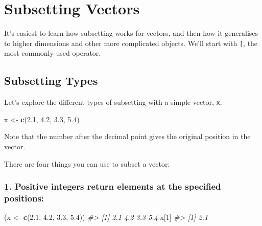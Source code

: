 \documentclass[]{book}
\newenvironment{Shaded}{\begin{snugshade}}{\end{snugshade}}
\newcommand{\CommentTok}[1]{\textcolor[rgb]{0.56,0.35,0.01}{\textit{#1}}}
\newcommand{\DecValTok}[1]{\textcolor[rgb]{0.00,0.00,0.81}{#1}}
\newcommand{\FloatTok}[1]{\textcolor[rgb]{0.00,0.00,0.81}{#1}}
\newcommand{\KeywordTok}[1]{\textcolor[rgb]{0.13,0.29,0.53}{\textbf{#1}}}
\newcommand{\NormalTok}[1]{#1}
\newcommand{\StringTok}[1]{\textcolor[rgb]{0.31,0.60,0.02}{#1}}
\begin{document}
\hypertarget{subsetting-vectors}{%
\section{Subsetting Vectors}\label{subsetting-vectors}}

It's easiest to learn how subsetting works for vectors, and then how it generalises to higher dimensions and other more complicated objects. We'll start with \texttt{{[}}, the most commonly used operator.

\hypertarget{subsetting-types}{%
\subsection{Subsetting Types}\label{subsetting-types}}

Let's explore the different types of subsetting with a simple vector, \texttt{x}.

\begin{Shaded}
\begin{Highlighting}[]
\NormalTok{x <-}\StringTok{ }\KeywordTok{c}\NormalTok{(}\FloatTok{2.1}\NormalTok{, }\FloatTok{4.2}\NormalTok{, }\FloatTok{3.3}\NormalTok{, }\FloatTok{5.4}\NormalTok{)}
\end{Highlighting}
\end{Shaded}

Note that the number after the decimal point gives the original position in the vector.

There are four things you can use to subset a vector:

\hypertarget{positive-integers-return-elements-at-the-specified-positions}{%
\subsubsection*{\texorpdfstring{1. \textbf{Positive integers} return elements at the specified positions:}{1. Positive integers return elements at the specified positions:}}\label{positive-integers-return-elements-at-the-specified-positions}}

\begin{Shaded}
\begin{Highlighting}[]
\NormalTok{(x <-}\StringTok{ }\KeywordTok{c}\NormalTok{(}\FloatTok{2.1}\NormalTok{, }\FloatTok{4.2}\NormalTok{, }\FloatTok{3.3}\NormalTok{, }\FloatTok{5.4}\NormalTok{))}
\CommentTok{#> [1] 2.1 4.2 3.3 5.4}
\NormalTok{x[}\DecValTok{1}\NormalTok{]}
\CommentTok{#> [1] 2.1}
\end{Highlighting}
\end{Shaded}
\end{document}
